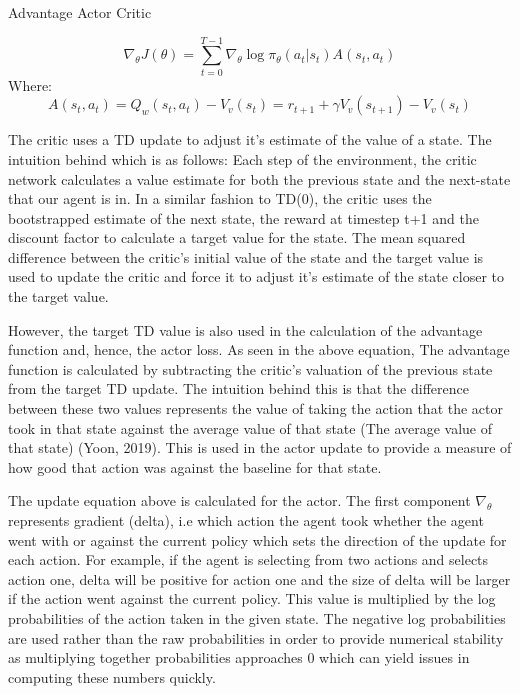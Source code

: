 \documentclass{article}
\begin{document}
Advantage Actor Critic

\begin{equation}
\nabla_{\theta} J(\theta) = \sum_{t=0}^{T-1}\nabla_{\theta}\log{\pi_{\theta}}(a_{t} | s_{t}) A(s_{t}, a_{t})
\end{equation}
Where:
\begin{equation}
A(s_{t}, a_{t}) = Q_{w}(s_{t}, a_{t}) - V_{v}(s_{t}) = r_{t+1} + \gamma V_{v}(s_{t+1}) - V_{v}(s_{t})
\end{equation}


The critic uses a TD update to adjust it's estimate of the value of a state. The intuition behind which is as follows: Each step of the environment, the critic network calculates a value estimate for both the previous state and the next-state that our agent is in. In a similar fashion to TD(0), the critic uses the bootstrapped estimate of the next state, the reward at timestep t+1 and the discount factor to calculate a target value for the state. The mean squared difference between the critic's initial value of the state and the target value is used to update the critic and force it to adjust it's estimate of the state closer to the target value.

However, the target TD value is also used in the calculation of the advantage function and, hence, the actor loss. As seen in the above equation, The advantage function is calculated by subtracting the critic's valuation of the previous state from the target TD update. The intuition behind this is that the difference between these two values represents the value of taking the action that the actor took in that state against the average value of that state (The average value of that state) (Yoon, 2019). This is used in the actor update to provide a measure of how good that action was against the baseline for that state.

The update equation above is calculated for the actor. The first component $\nabla_{\theta}$ represents gradient (delta), i.e which action the agent took whether the agent went with or against the current policy which sets the direction of the update for each action. For example, if the agent is selecting from two actions and selects action one, delta will be positive for action one and the size of delta will be larger if the action went against the current policy. This value is multiplied by the log probabilities of the action taken in the given state. The negative log probabilities are used rather than the raw probabilities in order to provide numerical stability as multiplying together probabilities approaches 0 which can yield issues in computing these numbers quickly.
\end{document}
